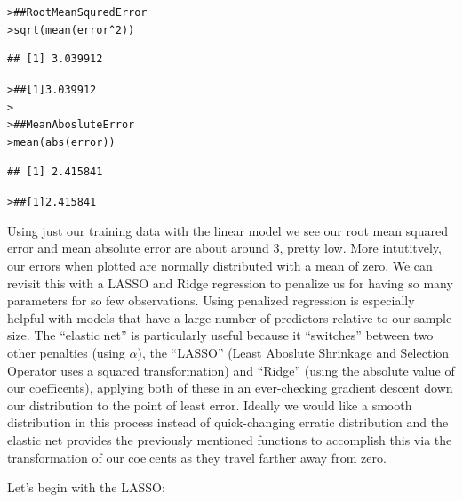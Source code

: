 \documentclass[12pt]{article}\usepackage[]{graphicx}\usepackage[]{color}
\makeatletter
\newcommand{\hlnum}[1]{\textcolor[rgb]{0.82,0.78,0.62}{#1}}%
\newcommand{\hlcom}[1]{\textcolor[rgb]{0.404,0.408,0.42}{#1}}%
\newcommand{\hlopt}[1]{\textcolor[rgb]{0.882,0.878,0.898}{#1}}%
\newcommand{\hlstd}[1]{\textcolor[rgb]{0.882,0.878,0.898}{#1}}%
\newcommand{\hlkwd}[1]{\textcolor[rgb]{0.733,0.388,0.812}{#1}}%
\newenvironment{kframe}{%
 \def\at@end@of@kframe{}%
 \ifinner\ifhmode%
  \def\at@end@of@kframe{\end{minipage}}%
  \begin{minipage}{\columnwidth}%
 \fi\fi%
 \def\FrameCommand##1{\hskip\@totalleftmargin \hskip-\fboxsep
 \colorbox{shadecolor}{##1}\hskip-\fboxsep
     \hskip-\linewidth \hskip-\@totalleftmargin \hskip\columnwidth}%
 \MakeFramed {\advance\hsize-\width
   \@totalleftmargin\z@ \linewidth\hsize
   \@setminipage}}%
 {\par\unskip\endMakeFramed%
 \at@end@of@kframe}
\newenvironment{knitrout}{}{} %
\makeatother
\begin{document}
\begin{flushleft}
\begin{center}
\begin{knitrout}
\end{knitrout}
\end{center}

\begin{knitrout}
\color{fgcolor}\begin{kframe}
\begin{alltt}
\hlstd{> }\hlcom{## Root Mean Squred Error}
\hlstd{> }\hlkwd{sqrt}\hlstd{(}\hlkwd{mean}\hlstd{(error}\hlopt{^}\hlnum{2}\hlstd{))}
\end{alltt}
\begin{verbatim}
## [1] 3.039912
\end{verbatim}
\begin{alltt}
\hlstd{> }\hlcom{## [1] 3.039912}
\hlstd{> }
\hlstd{> }\hlcom{## Mean Aboslute Error}
\hlstd{> }\hlkwd{mean}\hlstd{(}\hlkwd{abs}\hlstd{(error))}
\end{alltt}
\begin{verbatim}
## [1] 2.415841
\end{verbatim}
\begin{alltt}
\hlstd{> }\hlcom{## [1] 2.415841}
\end{alltt}
\end{kframe}
\end{knitrout}

Using just our training data with the linear model we see our root mean squared error and mean absolute error are about around 3, pretty low. More intutitvely, our errors when plotted are normally distributed with a mean of zero. We can revisit this with a LASSO and Ridge regression to penalize us for having so many parameters for so few observations. Using penalized regression is especially helpful with models that have a large number of predictors relative to our sample size. The ``elastic net'' is particularly useful because it ``switches'' between two other penalties (using $\alpha$), the ``LASSO'' (Least Aboslute Shrinkage and Selection Operator uses a squared transformation) and “Ridge” (using the absolute value of our coefficents), applying both of these in an ever-checking gradient descent down our distribution to the point of least error. Ideally we would like a smooth distribution in this process instead of quick-changing erratic distribution and the elastic net provides the previously mentioned functions to accomplish this via the transformation of our coecents as they travel farther away from zero.  

Let's begin with the LASSO:


\end{flushleft}
\end{document}
